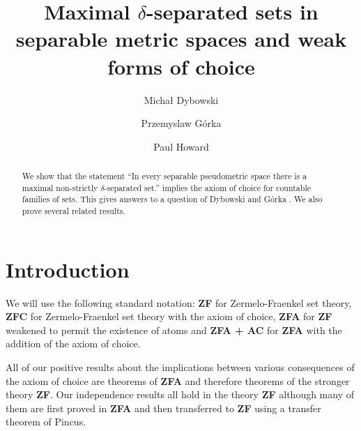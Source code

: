 \documentclass[11pt, reqno]{amsart}
\theoremstyle{definition}
\numberwithin{theorem}{section}
\theoremstyle{definition}
\theoremstyle{definition}
\theoremstyle{definition}
\theoremstyle{definition}
\theoremstyle{definition}
\numberwithin{claim}{section}
\theoremstyle{definition}
\theoremstyle{definition}
\theoremstyle{definition}
\theoremstyle{definition}
\theoremstyle{definition}
\theoremstyle{remboldstyle}
\begin{document}
\title[Maximal $\delta$-separated sets and \textbf{AC}]{Maximal $\delta$-separated sets in separable metric spaces and weak forms of choice}

\author[M. Dybowski]{Micha\l{} Dybowski}
\address{Faculty of Mathematics and Information Scineces,
Warsaw University of Technology,
Pl. Politechniki 1, 00-661 Warsaw, Poland}

\author[P. G\'{o}rka]{Przemyslaw G\'{o}rka}
\address{Faculty of Mathematics and Information Scineces,
Warsaw University of Technology,
Pl. Politechniki 1, 00-661 Warsaw, Poland}


\author[P. Howard]{Paul Howard}
\address{2770 Ember Way, Ann Arbor, MI 48104, USA}


\begin{abstract}
We show that the statement ``In every separable pseudometric space there is a maximal non-strictly $\delta$-separated set.'' implies the axiom of choice for countable families of sets.  This gives answers to a question of Dybowski and G\'{o}rka \cite{Dyb-Gorka1}.  We also prove several related results.
\end{abstract} 

\maketitle

\section{Introduction}
We will use the following standard notation:  \textbf{ZF} for Zermelo-Fraenkel set theory, \textbf{ZFC} for Zermelo-Fraenkel set theory with the axiom of choice, \textbf{ZFA} for \textbf{ZF} weakened to permit the existence of atoms and \textbf{ZFA + AC} for \textbf{ZFA} with the addition of the axiom of choice.

All of our positive results about the implications between various consequences of the axiom of choice are theorems of \textbf{ZFA} and therefore theorems of the stronger theory \textbf{ZF}.  Our independence results all hold in the theory \textbf{ZF} although many of them are  first proved in \textbf{ZFA} and then transferred to \textbf{ZF} using a transfer theorem of Pincus.
 
\end{document}
